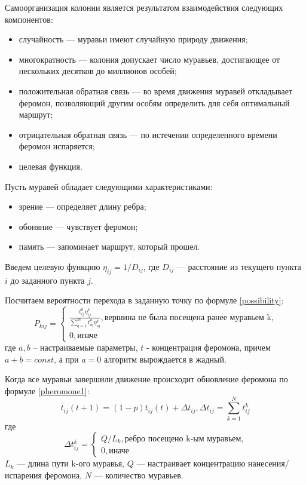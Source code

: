 \documentclass[12pt]{report}
\begin{document}
Самоорганизация колонии является результатом взаимодействия следующих компонентов:
\begin{itemize}
	\item случайность — муравьи имеют случайную природу движения;
	\item многократность — колония допускает число муравьев, достигающее от нескольких десятков до миллионов особей;
	\item положительная обратная связь — во время движения муравей откладывает феромон, позволяющий другим особям определить для себя оптимальный маршрут;
	\item отрицательная обратная связь — по истечении определенного времени феромон испаряется;
	\item целевая функция.
\end{itemize}

Пусть муравей обладает следующими характеристиками:
\begin{itemize}
	\item зрение — определяет длину ребра;
	\item обоняние — чувствует феромон;
	\item память — запоминает маршрут, который прошел.
\end{itemize}

Введем целевую функцию $\eta_{ij} = 1 / D_{ij}$, где $D_{ij}$ — расстояние из текущего пункта $i$ до заданного пункта $j$.

Посчитаем вероятности перехода в заданную точку по формуле \eqref{possibility}:
\begin{equation}
	\label{possibility}
	P_{kij} = \begin{cases}
		\frac{t_{ij}^a\eta_{ij}^b}{\sum_{q=1}^m t^a_{iq}\eta^b_{iq}}, \textrm{вершина не была посещена ранее муравьем k,} \\
		0, \textrm{иначе}
	\end{cases}
\end{equation}
где $a, b$ -- настраиваемые параметры, $t$ - концентрация феромона, причем $a + b = const$, а при $a = 0$ алгоритм вырождается в жадный.

Когда все муравьи завершили движение происходит обновление феромона по формуле \eqref{pheromone1}:
\begin{equation}
	\label{pheromone1}
	t_{ij}(t+1) = (1-p)t_{ij}(t) + \Delta t_{ij}, \Delta t_{ij} = \sum_{k=1}^N t^k_{ij}
\end{equation}
где
\begin{equation}
	\label{pheromone2}
	\Delta t^k_{ij} = \begin{cases}
		Q/L_{k}, \textrm{ребро посещено k-ым муравьем,} \\
		0, \textrm{иначе}
	\end{cases}
\end{equation}
$L_{k}$ — длина пути k-ого муравья, $Q$ — настраивает концентрацию нанесения/испарения феромона, $N$ — количество муравьев.
\end{document}
